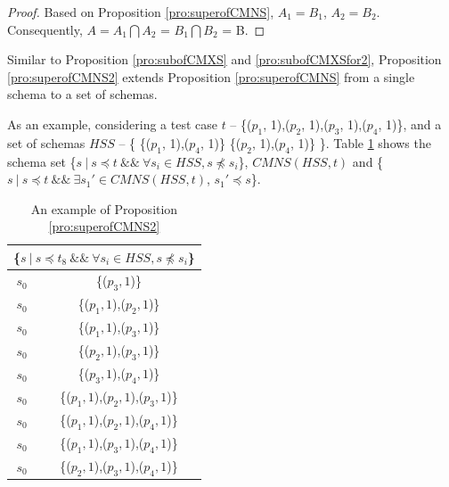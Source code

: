 {\begin{proof}
Based on Proposition \ref{pro:superofCMNS}, $A_{1} = B_{1}$, $A_{2} = B_{2}$. Consequently,
$A = A_{1} \bigcap A_{2}$ = $B_{1} \bigcap B_{2}$  = B.


\end{proof}

Similar to Proposition \ref{pro:subofCMXS} and \ref{pro:subofCMXSfor2},  Proposition \ref{pro:superofCMNS2} extends Proposition \ref{pro:superofCMNS} from a single  schema to a set of schemas.

As an example, considering a test case $t$ -- \{($p_{1}$, 1),($p_{2}$, 1),($p_{3}$, 1),($p_{4}$, 1)\}, and a set of schemas  $HSS$ -- \{ \{($p_{1}$, 1),($p_{4}$, 1)\}  \{($p_{2}$, 1),($p_{4}$, 1)\} \}. Table \ref{examleOfCMNSPro2} shows the schema set \{$s\ |\ s \preceq t\ \&\&\ \forall s_{i} \in HSS, s \npreceq s_{i} $\}, $CMNS(HSS, t)$ and \{$ s\ |\ s \preceq t \ \&\& \ \exists s_{1}' \in CMNS(HSS, t)$, $s_{1}' \preceq s$\}.

 \begin{table}[htbp]
  \centering
  \caption{An example of Proposition \ref{pro:superofCMNS2}}
  \label{examleOfCMNSPro2}
    \begin{tabular}{|c|c|} \hline
     \multicolumn{2}{|c|}{\{$s\ |\ s \preceq t_{8}\ \&\&\ \forall s_{i} \in HSS, s \npreceq s_{i} $\}} \\ \hline
   $s_{0}$ & \{($p_{3}, 1$)\} \\

   $s_{0}$ & \{($p_{1}, 1$),($p_{2}, 1$)\} \\
   $s_{0}$ & \{($p_{1}, 1$),($p_{3}, 1$)\} \\
   $s_{0}$ & \{($p_{2}, 1$),($p_{3}, 1$)\} \\
   $s_{0}$ & \{($p_{3}, 1$),($p_{4}, 1$)\} \\

   $s_{0}$ & \{($p_{1}, 1$),($p_{2}, 1$),($p_{3}, 1$)\} \\
   $s_{0}$ & \{($p_{1}, 1$),($p_{2}, 1$),($p_{4}, 1$)\} \\
   $s_{0}$ & \{($p_{1}, 1$),($p_{3}, 1$),($p_{4}, 1$)\} \\
   $s_{0}$ & \{($p_{2}, 1$),($p_{3}, 1$),($p_{4}, 1$)\} \\



\end{tabular}
\end{table}}
